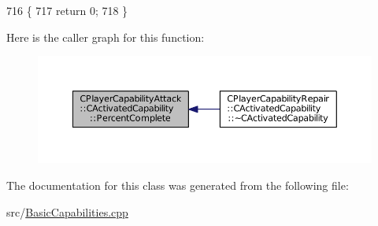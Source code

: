 \begin{DoxyCode}
716                                                                        \{
717     \textcolor{keywordflow}{return} 0;
718 \}
\end{DoxyCode}
Here is the caller graph for this function\+:\nopagebreak
\begin{figure}[H]
\begin{center}
\leavevmode
\includegraphics[width=350pt]{classCPlayerCapabilityAttack_1_1CActivatedCapability_a75866109b62de0522622b03137461519_icgraph}
\end{center}
\end{figure}


The documentation for this class was generated from the following file\+:\begin{DoxyCompactItemize}
\item 
src/\hyperlink{BasicCapabilities_8cpp}{Basic\+Capabilities.\+cpp}\end{DoxyCompactItemize}
